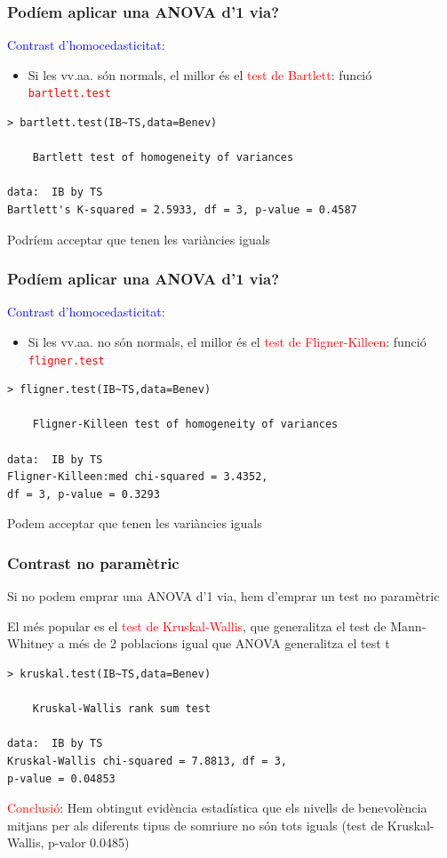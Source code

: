 \documentclass[12pt,t]{beamer}
\newcommand{\red}[1]{\textcolor{red}{#1}}
\newcommand{\blue}[1]{\textcolor{blue}{#1}}
\theoremstyle{plain}
\theoremstyle{definition}
\begin{document}
\begin{frame}[fragile] 
\frametitle{Podíem aplicar una ANOVA d'1 via?}\vspace*{-3ex}

\blue{Contrast d'homocedasticitat}:

\begin{itemize}
\item Si les vv.aa. són normals, el millor és el \red{test de Bartlett}: funció \red{\tt bartlett.test}
\end{itemize}
\begin{lstlisting}
> bartlett.test(IB~TS,data=Benev)

	Bartlett test of homogeneity of variances

data:  IB by TS
Bartlett's K-squared = 2.5933, df = 3, p-value = 0.4587
\end{lstlisting}
\medskip

Podríem acceptar que tenen les variàncies iguals
\end{frame}

\begin{frame}[fragile] 
\frametitle{Podíem aplicar una ANOVA d'1 via?}\vspace*{-3ex}

\blue{Contrast d'homocedasticitat}:

\begin{itemize}
\item Si les vv.aa. no són normals, el millor és el \red{test de Fligner-Killeen}: funció \red{\tt fligner.test} 
\end{itemize}
\begin{lstlisting}
> fligner.test(IB~TS,data=Benev)

	Fligner-Killeen test of homogeneity of variances

data:  IB by TS
Fligner-Killeen:med chi-squared = 3.4352, 
df = 3, p-value = 0.3293
\end{lstlisting}
\medskip

Podem acceptar que tenen les variàncies iguals
\end{frame}


\begin{frame}[fragile] 
\frametitle{Contrast no paramètric}

Si no podem emprar una ANOVA d'1 via, hem d'emprar un test no paramètric\medskip

El més popular es el \red{test de Kruskal-Wallis}, que generalitza el test de Mann-Whitney a més de 2 poblacions igual que ANOVA generalitza el test t

\begin{lstlisting}
> kruskal.test(IB~TS,data=Benev)     

	Kruskal-Wallis rank sum test

data:  IB by TS
Kruskal-Wallis chi-squared = 7.8813, df = 3, 
p-value = 0.04853
\end{lstlisting}\medskip


\red{Conclusió}: Hem obtingut evidència estadística que els nivells de benevolència mitjans per als diferents tipus de somriure no són tots iguals (test de Kruskal-Wallis, p-valor 0.0485)

\end{frame}
\end{document}

